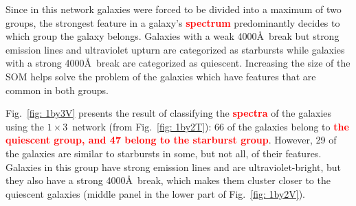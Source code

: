             Since in this network galaxies were forced to be divided into a maximum of two groups, the strongest feature in a galaxy's \textbf{\textcolor{red}{spectrum}} predominantly decides to which group the galaxy belongs.
            Galaxies with a weak 4000\AA~break but strong emission lines and ultraviolet upturn are categorized as starbursts while galaxies with a strong 4000\AA~break are categorized as quiescent.
            Increasing the size of the SOM helps solve the problem of the galaxies which have features that are common in both groups.
            
            Fig.~\ref{fig: 1by3V} presents the result of classifying the \textbf{\textcolor{red}{spectra}} of the galaxies using the $1\times3$~network (from Fig.~\ref{fig: 1by2T}): 66 of the galaxies belong to \textbf{\textcolor{red}{the quiescent group, and 47 belong to the starburst group}}. 
            However, 29 of the galaxies are similar to starbursts in some, but not all, of their features. 
            Galaxies in this group have strong emission lines and are ultraviolet-bright, but they also have a strong 4000\AA~break, which makes them cluster closer to the quiescent galaxies (middle panel in the lower part of Fig.~\ref{fig: 1by2V}).

